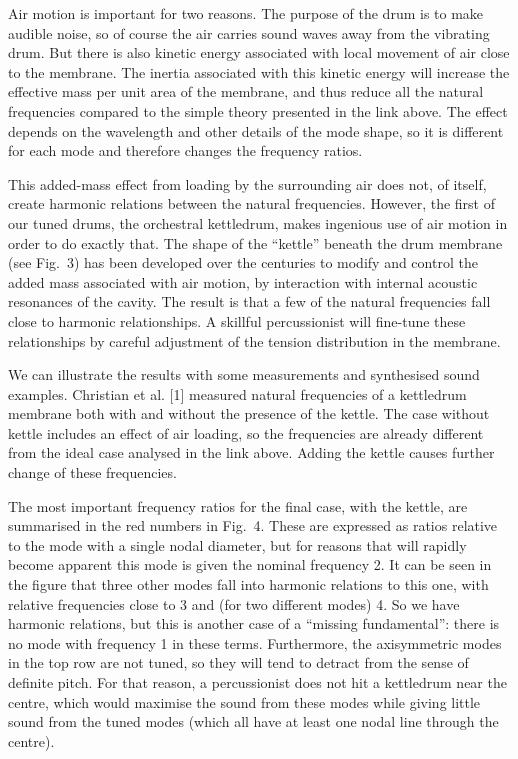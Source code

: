   Air motion is important for two reasons. The purpose of the drum is to make 
  audible noise, so of course the air carries sound waves away from the 
  vibrating drum. But there is also kinetic energy associated with local 
  movement of air close to the membrane. The inertia associated with this 
  kinetic energy will increase the effective mass per unit area of the 
  membrane, and thus reduce all the natural frequencies compared to the simple 
  theory presented in the link above. The effect depends on the wavelength and 
  other details of the mode shape, so it is different for each mode and 
  therefore changes the frequency ratios. 

  This added-mass effect from loading by the surrounding air does not, of 
  itself, create harmonic relations between the natural frequencies. However, 
  the first of our tuned drums, the orchestral kettledrum, makes ingenious use 
  of air motion in order to do exactly that. The shape of the ``kettle'' 
  beneath the drum membrane (see Fig.\ 3) has been developed over the centuries 
  to modify and control the added mass associated with air motion, by 
  interaction with internal acoustic resonances of the cavity. The result is 
  that a few of the natural frequencies fall close to harmonic relationships. A 
  skillful percussionist will fine-tune these relationships by careful 
  adjustment of the tension distribution in the membrane. 


  We can illustrate the results with some measurements and synthesised sound 
  examples. Christian et al. [1] measured natural frequencies of a kettledrum 
  membrane both with and without the presence of the kettle. The case without 
  kettle includes an effect of air loading, so the frequencies are already 
  different from the ideal case analysed in the link above. Adding the kettle 
  causes further change of these frequencies. 

  The most important frequency ratios for the final case, with the kettle, are 
  summarised in the red numbers in Fig.\ 4. These are expressed as ratios 
  relative to the mode with a single nodal diameter, but for reasons that will 
  rapidly become apparent this mode is given the nominal frequency 2. It can be 
  seen in the figure that three other modes fall into harmonic relations to 
  this one, with relative frequencies close to 3 and (for two different modes) 
  4. So we have harmonic relations, but this is another case of a ``missing 
  fundamental'': there is no mode with frequency 1 in these terms. Furthermore, 
  the axisymmetric modes in the top row are not tuned, so they will tend to 
  detract from the sense of definite pitch. For that reason, a percussionist 
  does not hit a kettledrum near the centre, which would maximise the sound 
  from these modes while giving little sound from the tuned modes (which all 
  have at least one nodal line through the centre). 

